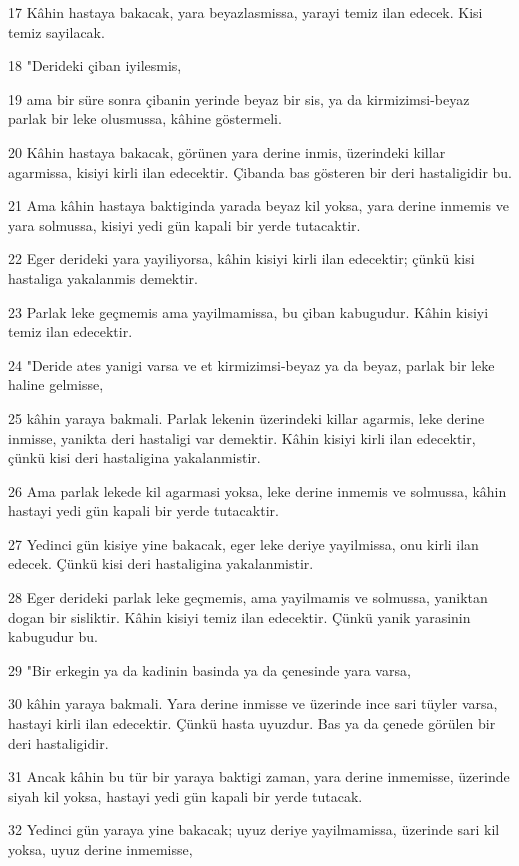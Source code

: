 \par 17 Kâhin hastaya bakacak, yara beyazlasmissa, yarayi temiz ilan edecek. Kisi temiz sayilacak.
\par 18 "Derideki çiban iyilesmis,
\par 19 ama bir süre sonra çibanin yerinde beyaz bir sis, ya da kirmizimsi-beyaz parlak bir leke olusmussa, kâhine göstermeli.
\par 20 Kâhin hastaya bakacak, görünen yara derine inmis, üzerindeki killar agarmissa, kisiyi kirli ilan edecektir. Çibanda bas gösteren bir deri hastaligidir bu.
\par 21 Ama kâhin hastaya baktiginda yarada beyaz kil yoksa, yara derine inmemis ve yara solmussa, kisiyi yedi gün kapali bir yerde tutacaktir.
\par 22 Eger derideki yara yayiliyorsa, kâhin kisiyi kirli ilan edecektir; çünkü kisi hastaliga yakalanmis demektir.
\par 23 Parlak leke geçmemis ama yayilmamissa, bu çiban kabugudur. Kâhin kisiyi temiz ilan edecektir.
\par 24 "Deride ates yanigi varsa ve et kirmizimsi-beyaz ya da beyaz, parlak bir leke haline gelmisse,
\par 25 kâhin yaraya bakmali. Parlak lekenin üzerindeki killar agarmis, leke derine inmisse, yanikta deri hastaligi var demektir. Kâhin kisiyi kirli ilan edecektir, çünkü kisi deri hastaligina yakalanmistir.
\par 26 Ama parlak lekede kil agarmasi yoksa, leke derine inmemis ve solmussa, kâhin hastayi yedi gün kapali bir yerde tutacaktir.
\par 27 Yedinci gün kisiye yine bakacak, eger leke deriye yayilmissa, onu kirli ilan edecek. Çünkü kisi deri hastaligina yakalanmistir.
\par 28 Eger derideki parlak leke geçmemis, ama yayilmamis ve solmussa, yaniktan dogan bir sisliktir. Kâhin kisiyi temiz ilan edecektir. Çünkü yanik yarasinin kabugudur bu.
\par 29 "Bir erkegin ya da kadinin basinda ya da çenesinde yara varsa,
\par 30 kâhin yaraya bakmali. Yara derine inmisse ve üzerinde ince sari tüyler varsa, hastayi kirli ilan edecektir. Çünkü hasta uyuzdur. Bas ya da çenede görülen bir deri hastaligidir.
\par 31 Ancak kâhin bu tür bir yaraya baktigi zaman, yara derine inmemisse, üzerinde siyah kil yoksa, hastayi yedi gün kapali bir yerde tutacak.
\par 32 Yedinci gün yaraya yine bakacak; uyuz deriye yayilmamissa, üzerinde sari kil yoksa, uyuz derine inmemisse,
